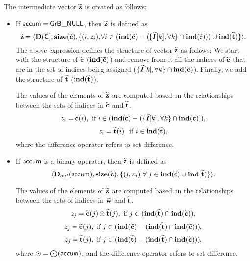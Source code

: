 The intermediate vector ${\bf \widetilde{z}}$ is created as follows:
\begin{itemize}
    \item If ${\sf accum} = {\sf GrB\_NULL}$, then ${\bf \widetilde{z}}$ is defined as 
    \[ 
        {\bf \widetilde{z}} =
		\langle \bold{D}({\sf C}), \bold{size}({\bf \widetilde{c}}), 
		\{(i,z_{i}), \forall i \in (\bold{ind}({\bf \widetilde{c}})-(\{\bm{\widetilde{I}}[k],\forall k\} \cap \bold{ind}({\bf \widetilde{c}}))) \cup 
        \bold{ind}({\bf \widetilde{t}}) \} \rangle.
    \]
    The above expression defines the structure of vector ${\bf \widetilde{z}}$ as follows:
    We start with the structure of ${\bf \widetilde{c}}$ ($\bold{ind}({\bf \widetilde{c}})$) and remove from 
    it all the indices of ${\bf \widetilde{c}}$ that are
    in the set of indices being assigned ($\{\bm{\widetilde{I}}[k],\forall k\} \cap \bold{ind}({\bf \widetilde{c}})$). Finally, we
    add the structure of ${\bf \widetilde{t}}$ ($\bold{ind}({\bf \widetilde{t}})$).

    The values of the elements of ${\bf \widetilde{z}}$ are computed based on the 
    relationships between the sets of indices in ${\bf \widetilde{c}}$ 
    and ${\bf \widetilde{t}}$.
    \[
        z_{i} = \vector{\widetilde{c}}(i), \ \mbox{if}\  i \in  
        (\bold{ind}(\vector{\widetilde{c}}) - (\{\grbarray{\widetilde{I}}[k],\forall k\}
        \cap \bold{ind}(\vector{\widetilde{c}}))),
    \]
    \[
        z_{i} = \vector{\widetilde{t}}(i), \ \mbox{if}\  i \in  
        \bold{ind}(\vector{\widetilde{t}}),
    \]
    where the difference operator refers to set difference.

    \item If ${\sf accum}$ is a binary operator, then ${\bf \widetilde{z}}$ is defined as
        \[ \langle \mbox{$\mathbf{D}_{out}$}({\sf accum}), \bold{size}({\bf \widetilde{c}}),
        \{(j,z_{j}) \ \forall \ j \in \bold{ind}({\bf \widetilde{c}}) \cup 
        \bold{ind}({\bf \widetilde{t}}) \} \rangle.\]

    The values of the elements of ${\bf \widetilde{z}}$ are computed based on the 
    relationships between the sets of indices in ${\bf \widetilde{w}}$ and 
    ${\bf \widetilde{t}}$.
\[
    z_{j} = {\bf \widetilde{c}}(j) \odot {\bf \widetilde{t}}(j), \ \mbox{if}\  
    j \in  (\bold{ind}({\bf \widetilde{t}}) \cap \bold{ind}({\bf \widetilde{c}})),
\]
\[
    z_{j} = {\bf \widetilde{c}}(j), \ \mbox{if}\  
    j \in  (\bold{ind}({\bf \widetilde{c}}) - (\bold{ind}({\bf \widetilde{t}})
    \cap \bold{ind}({\bf \widetilde{c}}))),
\]
\[
    z_{j} = \vector{\widetilde{t}}(j), \ \mbox{if}\  j \in  
    (\bold{ind}(\vector{\widetilde{t}}) - (\bold{ind}(\vector{\widetilde{t}})
    \cap \bold{ind}(\vector{\widetilde{c}}))),
\]
where $\odot  = \bigodot({\sf accum})$, and the difference operator refers to set difference.
\end{itemize}

